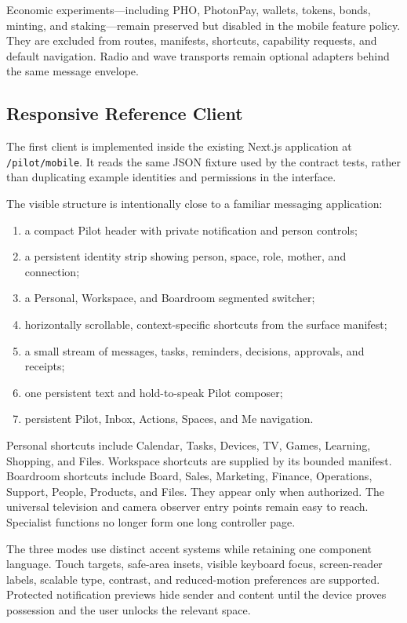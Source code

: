 Economic experiments---including PHO, PhotonPay, wallets, tokens, bonds, minting, and
staking---remain preserved but disabled in the mobile feature policy.  They are excluded
from routes, manifests, shortcuts, capability requests, and default navigation.  Radio
and wave transports remain optional adapters behind the same message envelope.

\subsection{Responsive Reference Client}

The first client is implemented inside the existing Next.js application at
\texttt{/pilot/mobile}.  It reads the same JSON fixture used by the contract tests, rather
than duplicating example identities and permissions in the interface.

The visible structure is intentionally close to a familiar messaging application:

\begin{enumerate}
  \item a compact Pilot header with private notification and person controls;
  \item a persistent identity strip showing person, space, role, mother, and connection;
  \item a Personal, Workspace, and Boardroom segmented switcher;
  \item horizontally scrollable, context-specific shortcuts from the surface manifest;
  \item a small stream of messages, tasks, reminders, decisions, approvals, and receipts;
  \item one persistent text and hold-to-speak Pilot composer;
  \item persistent Pilot, Inbox, Actions, Spaces, and Me navigation.
\end{enumerate}

{\setlength{\emergencystretch}{2em}
Personal shortcuts include Calendar, Tasks, Devices, TV, Games, Learning, Shopping, and
Files.  Workspace shortcuts are supplied by its bounded manifest.  Boardroom shortcuts
include Board, Sales, Marketing, Finance, Operations, Support, People, Products, and
Files.  They appear only when authorized.  The universal television and camera observer
entry points remain easy to reach.  Specialist functions no longer form one long
controller page.\par}

The three modes use distinct accent systems while retaining one component language.
Touch targets, safe-area insets, visible keyboard focus, screen-reader labels, scalable
type, contrast, and reduced-motion preferences are supported.  Protected notification
previews hide sender and content until the device proves possession and the user unlocks
the relevant space.

